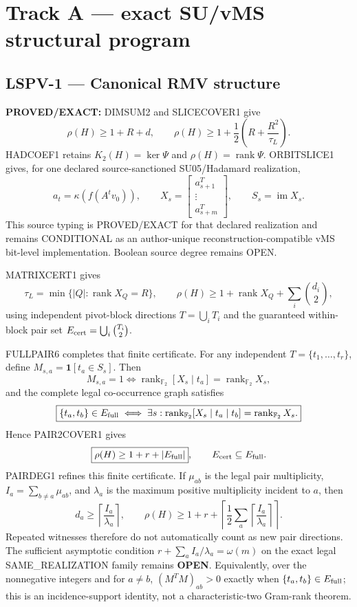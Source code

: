 \documentclass[11pt]{article}
\begin{document}
\section{Track A --- exact SU/vMS structural program}

\subsection{LSPV-1 --- Canonical RMV structure}
\textbf{PROVED/EXACT:} DIMSUM2 and SLICECOVER1 give
\[
\rho(H)\ge1+R+d,\qquad
\rho(H)\ge1+\frac12\left(R+\frac{R^2}{\tau_L}\right).
\]
HADCOEF1 retains \(K_2(H)=\ker\Psi\) and \(\rho(H)=\operatorname{rank}\Psi\).
ORBITSLICE1 gives, for one declared source-sanctioned SU05/Hadamard realization,
\[
a_t=\kappa(f(A^tv_0)),\qquad
X_s=\begin{bmatrix}a_{s+1}^{T}\\ \vdots\\ a_{s+m}^{T}\end{bmatrix},
\qquad S_s=\operatorname{im}X_s.
\]
This source typing is PROVED/EXACT for that declared realization and remains CONDITIONAL as an
author-unique reconstruction-compatible vMS bit-level implementation. Boolean source degree remains OPEN.

MATRIXCERT1 gives
\[
\tau_L=\min\{|Q|:\operatorname{rank}X_Q=R\},
\qquad
\rho(H)\ge1+\operatorname{rank}X_Q+\sum_i\binom{d_i}{2},
\]
using independent pivot-block directions \(T=\bigcup_iT_i\) and the guaranteed within-block
pair set \(E_{\rm cert}=\bigcup_i\binom{T_i}{2}\).

FULLPAIR6 completes that finite certificate. For any independent
\(T=\{t_1,\ldots,t_r\}\), define \(M_{s,a}=\mathbf1[t_a\in S_s]\). Then
\[
M_{s,a}=1\iff
\operatorname{rank}_{\mathbb F_2}[X_s\mid t_a]
=\operatorname{rank}_{\mathbb F_2}X_s,
\]
and the complete legal co-occurrence graph satisfies
\[
\boxed{
\{t_a,t_b\}\in E_{\rm full}
\iff
\exists s:\operatorname{rank}_{\mathbb F_2}[X_s\mid t_a\mid t_b]
=\operatorname{rank}_{\mathbb F_2}X_s.}
\]
Hence PAIR2COVER1 gives
\[
\boxed{\rho(H)\ge1+r+|E_{\rm full}|},
\qquad E_{\rm cert}\subseteq E_{\rm full}.
\]
PAIRDEG1 refines this finite certificate. If \(\mu_{ab}\) is the legal pair multiplicity,
\(I_a=\sum_{b\ne a}\mu_{ab}\), and \(\lambda_a\) is the maximum positive multiplicity
incident to \(a\), then
\[
d_a\ge\left\lceil\frac{I_a}{\lambda_a}\right\rceil,\qquad
\boxed{\rho(H)\ge1+r+
\left\lceil\frac12\sum_a\left\lceil\frac{I_a}{\lambda_a}\right\rceil\right\rceil}.
\]
Repeated witnesses therefore do not automatically count as new pair directions. The sufficient
asymptotic condition \(r+\sum_a I_a/\lambda_a=\omega(m)\) on the exact legal
SAME\_REALIZATION family remains \textbf{OPEN}.
Equivalently, over the nonnegative integers and for \(a\ne b\),
\((M^TM)_{ab}>0\) exactly when \(\{t_a,t_b\}\in E_{\rm full}\); this is an incidence-support
identity, not a characteristic-two Gram-rank theorem.
\end{document}
